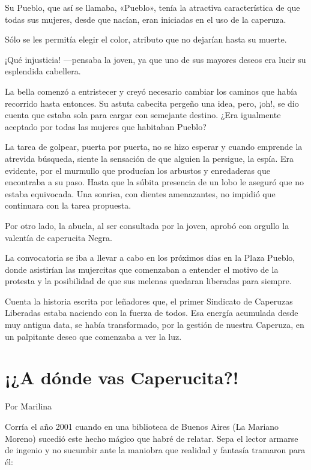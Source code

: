 \documentclass[11pt,twoside,openright,a5paper]{book}
\begin{document}
Su Pueblo, que así se llamaba, «Pueblo», tenía la atractiva característica de que todas sus mujeres, desde que nacían, eran iniciadas en el uso de la caperuza.

Sólo se les permitía elegir el color, atributo que no dejarían hasta su muerte.

¡Qué injusticia! ---pensaba la joven, ya que uno de sus mayores deseos era lucir su esplendida cabellera.

La bella comenzó a entristecer y creyó necesario cambiar los caminos que había recorrido hasta entonces.
Su astuta cabecita pergeño una idea, pero, ¡oh!, se dio cuenta que estaba sola para cargar con semejante destino. ¿Era igualmente aceptado por todas las mujeres que habitaban Pueblo?

La tarea de golpear, puerta por puerta, no se hizo esperar y cuando emprende la atrevida búsqueda, siente la sensación de que alguien la persigue, la espía. Era evidente, por el murmullo que producían los arbustos y enredaderas que encontraba a su paso. Hasta que la súbita presencia de un lobo le aseguró que no estaba equivocada. Una sonrisa, con dientes amenazantes, no impidió que continuara con la tarea propuesta.

Por otro lado, la abuela, al ser consultada por la joven, aprobó con orgullo la valentía de caperucita Negra.

La convocatoria se iba a llevar a cabo en los próximos días en la Plaza Pueblo, donde asistirían las mujercitas que comenzaban a entender el motivo de la protesta y la posibilidad de que sus melenas quedaran liberadas para siempre.

Cuenta la historia escrita por leñadores que, el primer Sindicato de Caperuzas Liberadas estaba naciendo con la fuerza de todos. Esa energía acumulada desde muy antigua data, se había transformado, por la gestión de nuestra Caperuza, en un palpitante deseo que comenzaba a ver la luz.


\section*{¡¿A dónde vas Caperucita?!}

\begin{flushright}Por Marilina\end{flushright}

Corría el año 2001 cuando en una biblioteca de Buenos Aires (La Mariano Moreno) sucedió este hecho mágico que habré de relatar. Sepa el lector armarse de ingenio y no sucumbir ante la maniobra que realidad y fantasía tramaron para él:
\end{document}
